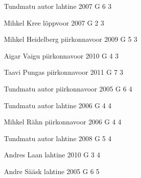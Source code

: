 \documentclass[11pt]{article}
\begin{document}
{Tundmatu autor} %
{lahtine} %
{2007} %
{G 6} %
{3} %
{

\ifEngHint
\fi
}

{Mihkel Kree} %
{lõppvoor} %
{2007} %
{G 2} %
{3} %
{

\ifEngHint
\fi
}

{Mihkel Heidelberg} %
{piirkonnavoor} %
{2009} %
{G 5} %
{3} %
{

\ifEngHint
\fi
}

{Aigar Vaigu} %
{piirkonnavoor} %
{2010} %
{G 4} %
{3} %
{

\ifEngHint
\fi
}

{Taavi Pungas} %
{piirkonnavoor} %
{2011} %
{G 7} %
{3} %
{

\ifEngHint
\fi
}

{Tundmatu autor} %
{piirkonnavoor} %
{2005} %
{G 6} %
{4} %
{

\ifEngHint
\fi
}

{Tundmatu autor} %
{lahtine} %
{2006} %
{G 4} %
{4} %
{

\ifEngHint
\fi
}

{Mihkel Rähn} %
{piirkonnavoor} %
{2006} %
{G 4} %
{4} %
{

\ifEngHint
\fi
}

{Tundmatu autor} %
{lahtine} %
{2008} %
{G 5} %
{4} %
{

\ifEngHint
\fi
}

{Andres Laan} %
{lahtine} %
{2010} %
{G 3} %
{4} %
{

\ifEngHint
\fi
}

{Andre Sääsk} %
{lahtine} %
{2005} %
{G 6} %
{5} %
{

\ifEngHint
\fi
}
\end{document}
